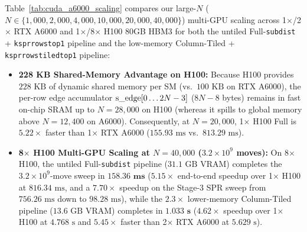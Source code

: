 \documentclass[11pt,a4paper]{article}
\makeatletter
\DeclareRobustCommand{\_}{\ifmmode\nfss@text{\textunderscore}\else\textunderscore\allowbreak\fi}
\theoremstyle{definition}
\makeatother
\begin{document}
Table~\ref{tab:cuda_a6000_scaling} compares our large-$N$ ($N \in \{1{,}000, 2{,}000, 4{,}000, 10{,}000, 20{,}000, 40{,}000\}$) multi-GPU scaling across 1$\times$/2$\times$ RTX A6000 and 1$\times$/8$\times$ H100 80GB HBM3 for both the untiled Full-\texttt{subdist} + \texttt{k\_spr\_rows\_top1} pipeline and the low-memory Column-Tiled + \texttt{k\_spr\_rows\_tiled\_top1} pipeline:
\begin{itemize}
    \item \textbf{228 KB Shared-Memory Advantage on H100:} Because H100 provides $228\text{ KB}$ of dynamic shared memory per SM (vs.\ $100\text{ KB}$ on RTX A6000), the per-row edge accumulator $\text{s\_edge}[0 \dots 2N-3]$ ($8N-8$ bytes) remains in fast on-chip SRAM up to $N = 28{,}000$ on H100 (whereas it spills to global memory above $N = 12{,}400$ on A6000). Consequently, at $N = 20{,}000$, 1$\times$ H100 Full is $\mathbf{5.22\times}$ faster than 1$\times$ RTX A6000 ($155.93\text{ ms}$ vs.\ $813.29\text{ ms}$).
    \item \textbf{8$\times$ H100 Multi-GPU Scaling at $N = 40{,}000$ ($3.2 \times 10^9$ moves):} On 8$\times$ H100, the untiled Full-\texttt{subdist} pipeline ($31.1\text{ GB}$ VRAM) completes the $3.2 \times 10^9$-move sweep in $\mathbf{158.36\text{ ms}}$ ($\mathbf{5.15\times}$ end-to-end speedup over 1$\times$ H100 at $816.34\text{ ms}$, and a $\mathbf{7.70\times}$ speedup on the Stage-3 SPR sweep from $756.26\text{ ms}$ down to $98.28\text{ ms}$), while the $2.3\times$ lower-memory Column-Tiled pipeline ($13.6\text{ GB}$ VRAM) completes in $\mathbf{1.033\text{ s}}$ ($\mathbf{4.62\times}$ speedup over 1$\times$ H100 at $4.768\text{ s}$ and $\mathbf{5.45\times}$ faster than 2$\times$ RTX A6000 at $5.629\text{ s}$).
\end{itemize}
\end{document}
